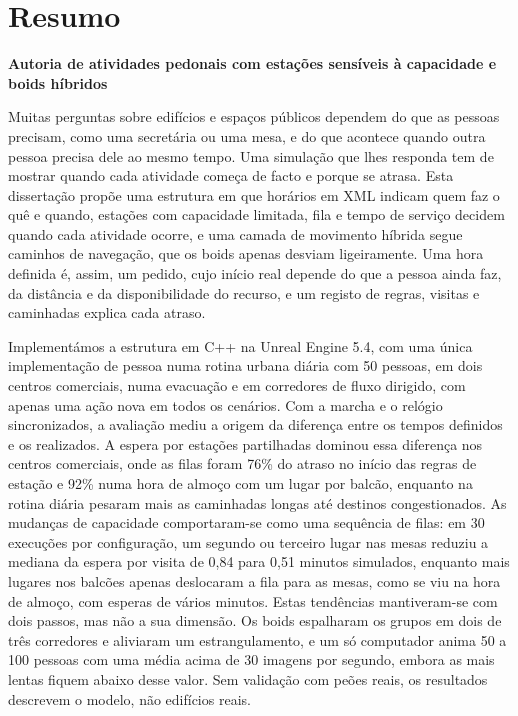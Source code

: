 \chapter*{Resumo}

\noindent\textbf{Autoria de atividades pedonais com estações sensíveis à capacidade e boids híbridos}

Muitas perguntas sobre edifícios e espaços públicos dependem do que as pessoas precisam, como uma secretária ou uma mesa, e do que acontece quando outra pessoa precisa dele ao mesmo tempo. Uma simulação que lhes responda tem de mostrar quando cada atividade começa de facto e porque se atrasa. Esta dissertação propõe uma estrutura em que horários em XML indicam quem faz o quê e quando, estações com capacidade limitada, fila e tempo de serviço decidem quando cada atividade ocorre, e uma camada de movimento híbrida segue caminhos de navegação, que os boids apenas desviam ligeiramente. Uma hora definida é, assim, um pedido, cujo início real depende do que a pessoa ainda faz, da distância e da disponibilidade do recurso, e um registo de regras, visitas e caminhadas explica cada atraso.

Implementámos a estrutura em C++ na Unreal Engine 5.4, com uma única implementação de pessoa numa rotina urbana diária com 50 pessoas, em dois centros comerciais, numa evacuação e em corredores de fluxo dirigido, com apenas uma ação nova em todos os cenários. Com a marcha e o relógio sincronizados, a avaliação mediu a origem da diferença entre os tempos definidos e os realizados. A espera por estações partilhadas dominou essa diferença nos centros comerciais, onde as filas foram 76\% do atraso no início das regras de estação e 92\% numa hora de almoço com um lugar por balcão, enquanto na rotina diária pesaram mais as caminhadas longas até destinos congestionados. As mudanças de capacidade comportaram-se como uma sequência de filas: em 30 execuções por configuração, um segundo ou terceiro lugar nas mesas reduziu a mediana da espera por visita de 0,84 para 0,51 minutos simulados, enquanto mais lugares nos balcões apenas deslocaram a fila para as mesas, como se viu na hora de almoço, com esperas de vários minutos. Estas tendências mantiveram-se com dois passos, mas não a sua dimensão. Os boids espalharam os grupos em dois de três corredores e aliviaram um estrangulamento, e um só computador anima 50 a 100 pessoas com uma média acima de 30 imagens por segundo, embora as mais lentas fiquem abaixo desse valor. Sem validação com peões reais, os resultados descrevem o modelo, não edifícios reais.

